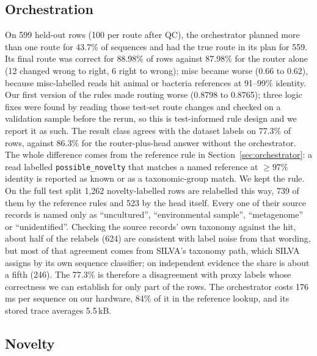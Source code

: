 \documentclass[conference]{IEEEtran}
\begin{document}
\subsection{Orchestration}

On 599 held-out rows (100 per route after QC), the orchestrator planned more than one route for 43.7\% of sequences and had the true route in its plan for 559. Its final route was correct for 88.98\% of rows against 87.98\% for the router alone (12 changed wrong to right, 6 right to wrong); misc became worse (0.66 to 0.62), because misc-labelled reads hit animal or bacteria references at 91--99\% identity. Our first version of the rules made routing worse (0.8798 to 0.8765); three logic fixes were found by reading those test-set route changes and checked on a validation sample before the rerun, so this is test-informed rule design and we report it as such. The result class agrees with the dataset labels on 77.3\% of rows, against 86.3\% for the router-plus-head answer without the orchestrator. The whole difference comes from the reference rule in Section~\ref{sec:orchestrator}: a read labelled \texttt{possible\_novelty} that matches a named reference at $\geq 97\%$ identity is reported as known or as a taxonomic-group match. We kept the rule. On the full test split 1{,}262 novelty-labelled rows are relabelled this way, 739 of them by the reference rules and 523 by the head itself. Every one of their source records is named only as ``uncultured'', ``environmental sample'', ``metagenome'' or ``unidentified''. Checking the source records' own taxonomy against the hit, about half of the relabels (624) are consistent with label noise from that wording, but most of that agreement comes from SILVA's taxonomy path, which SILVA assigns by its own sequence classifier; on independent evidence the share is about a fifth (246). The 77.3\% is therefore a disagreement with proxy labels whose correctness we can establish for only part of the rows. The orchestrator costs 176\,ms per sequence on our hardware, 84\% of it in the reference lookup, and its stored trace averages 5.5\,kB.

\subsection{Novelty}
\label{sec:novelty}
\end{document}
